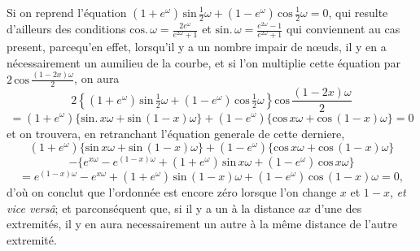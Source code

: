 \documentclass[11pt,a4paper]{article}
\begin{document}
Si on reprend l'équation $(1 + e^{\omega})\,\text{sin}\,\frac{1}{2}\omega + (1 - e^{\omega})\,\text{cos}\,\frac{1}{2}\omega = 0$, qui resulte d'ailleurs des
conditions $\text{cos}.\,\omega = \frac{2e^{\omega}}{e^{2\omega} + 1}$ et $\text{sin}.\,\omega = \frac{e^{2\omega} - 1}{e^{2\omega} + 1}$ qui conviennent au cas present,  parcequ'en effet,
lorsqu'il y a un nombre impair de nœuds, il y en a nécessairement un aumilieu
de la courbe, et si l'on multiplie cette équation par $2\,\text{cos}\,\frac{(1-2x)\omega}{2}$,
on aura
\[ 2\left\{(1 + e^{\omega})\,\text{sin}\,\tfrac{1}{2}\omega + (1 - e^{\omega})\,\text{cos}\,\tfrac{1}{2}\omega\right\}\text{cos}\,\frac{(1-2x)\omega}{2} \]
\[ = (1 + e^{\omega})\{\text{sin}.\,x\omega + \text{sin}\,(1-x)\omega\} + (1 - e^{\omega})\{\text{cos}\,x\omega + \text{cos}\,(1-x)\omega\} = 0 \]
et on trouvera, en retranchant l'équation generale de cette derniere,
\[ (1 + e^{\omega})\{\text{sin}\,x\omega + \text{sin}\,(1-x)\omega\} + (1 - e^{\omega})\{\text{cos}\,x\omega + \text{cos}\,(1-x)\omega\} \]
\[ - \{e^{x\omega} - e^{(1-x)\omega} + (1 + e^{\omega})\,\text{sin}\,x\omega + (1 - e^{\omega})\,\text{cos}\,x\omega\} \]
\[ = e^{(1-x)\omega} - e^{x\omega} + (1 + e^{\omega})\,\text{sin}\,(1-x)\omega + (1 - e^{\omega})\,\text{cos}\,(1-x)\omega = 0, \]
d'où on conclut que l'ordonnée est encore zéro lorsque l'on change $x$ et $1-x$,
\emph{et vice versâ}; et parconséquent que, si il y a un  à la distance $ax$ d'une des
extremités, il y en aura necessairement un autre à la même distance de l'autre
extremité.
\end{document}
